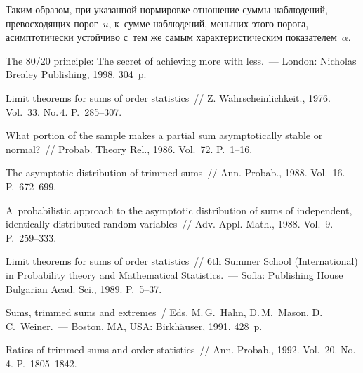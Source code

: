 \begin{multicols}{2}
Таким образом, при указанной нормировке отношение суммы наблюдений, 
превосходящих порог~$u$, к~сумме наблюдений, меньших этого порога, 
асимптотически устойчиво с~тем же самым характеристическим показателем~$\alpha$.



{\small\frenchspacing
 {%


 \begin{thebibliography}{99}


 The 80/20 principle: The secret of achieving more with less.~--- 
London: Nicholas Brealey Publishing, 1998. 304~p. 

Limit theorems for sums of order statistics~// 
Z. Wahrscheinlichkeit., 1976. Vol.~33. No.\,4. P.~285--307.

What portion of the sample makes a partial sum asymptotically stable or normal?~// 
Probab. Theory Rel., 1986. Vol.~72. P.~1--16.

The asymptotic distribution of trimmed
sums~// Ann. Probab., 1988. Vol.~16. P.~672--699.

A~probabilistic approach to the asymptotic
distribution of sums of independent, identically distributed random variables~// 
Adv. Appl. Math., 1988. Vol.~9. P.~259--333.

Limit theorems for sums of order statistics~// 6th  Summer School
(International) in Probability theory and Mathematical Statistics.~--- 
Sofia: Publishing House Bulgarian Acad. Sci., 1989. P.~5--37.


Sums, trimmed sums and extremes~/ Eds. M.\,G.~Hahn,  D.\,M.~Mason, 
D.\,C.~Weiner.~--- Boston, MA, USA: Birkh$\ddot{\mbox{a}}$user, 1991. 428~p.

 Ratios of trimmed sums and order statistics~// 
Ann. Probab., 1992. Vol.~20. No.\,4. P.~1805--1842.


\end{thebibliography}}}
\end{multicols}
